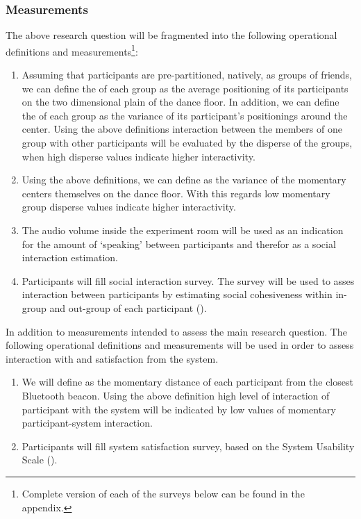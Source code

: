 \subsubsection{Measurements}

The above research question will be fragmented into the following operational definitions and measurements\footnote{Complete version of each of the surveys below can be found in the appendix.}:
\begin{enumerate}
	\item \label{measure:disperse} Assuming that participants are pre-partitioned, natively, as groups of friends, we can define the  of each group as the average positioning of its participants on the two dimensional plain of the dance floor.
	In addition, we can define the  of each group as the variance of its participant's positionings around the center.
	Using the above definitions interaction between the members of one group with other participants will be evaluated by the disperse of the groups, when high disperse values indicate higher interactivity.
	\item \label{measure:groups} Using the above definitions, we can define  as the variance of the momentary centers themselves on the dance floor.
	With this regards low momentary group disperse values indicate higher interactivity.
	\item \label{measure:audio} The audio volume inside the experiment room will be used as an indication for the amount of `speaking' between participants and therefor as a social interaction estimation.
	\item \label{measure:survey:social} Participants will fill social interaction survey.
	The survey will be used to asses interaction between participants by estimating social cohesiveness within in-group and out-group of each participant ().
\end{enumerate}
In addition to measurements intended to assess the main research question.
The following operational definitions and measurements will be used in order to assess interaction with and satisfaction from the system.
\begin{enumerate}[resume]
	\item \label{measure:system} We will define  as the momentary distance of each participant from the closest Bluetooth beacon.
	Using the above definition high level of interaction of participant with the system will be indicated by low values of momentary participant-system interaction.
	\item \label{measure:survey:usability} Participants will fill system satisfaction survey, based on the System Usability Scale (\cite{brooke96}).
\end{enumerate}
